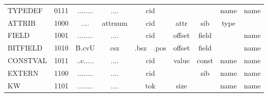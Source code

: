 \begin{table}[H]
\begin{tabular}{l|c|c|c|c|c|l|c|c|c|c|}
\multicolumn{1}{|l|}{TYPEDEF}  & 0111 & \multicolumn{2}{c|}{........}       & ....      & \multicolumn{2}{c|}{cid} &                       &                      & name                  & name                  \\
\multicolumn{1}{|l|}{ATTRIB}   & 1000 & ....             & \multicolumn{2}{c|}{attrnum} & \multicolumn{2}{c|}{cid} & attr                  & sib                  & type                  &                       \\
\multicolumn{1}{|l|}{FIELD}    & 1001 & \multicolumn{2}{c|}{........}       & ....      & \multicolumn{2}{c|}{cid} & offset                & field                &                       & name                  \\
\multicolumn{1}{|l|}{BITFIELD} & 1010 & B.cvU            & \multicolumn{2}{c|}{csz}     & .bsz        & .pos       & offset                & field                &                       & name                  \\
\multicolumn{1}{|l|}{CONSTVAL} & 1011 & \multicolumn{2}{c|}{..c.....}       & ....      & \multicolumn{2}{c|}{cid} & value                 & const                & name                  & name                  \\
\multicolumn{1}{|l|}{EXTERN}   & 1100 & \multicolumn{2}{c|}{........}       & ....      & \multicolumn{2}{c|}{cid} &                       & sib                  & name                  & name                  \\
\multicolumn{1}{|l|}{KW}       & 1101 & \multicolumn{2}{c|}{........}       & ....      & \multicolumn{2}{c|}{tok} & size                  &                      & name                  & name                  \\ \hline
\end{tabular}
\end{table}

